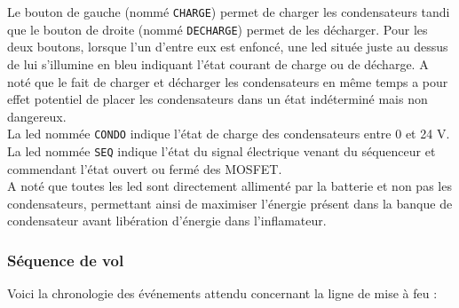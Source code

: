 \vspace{0.2cm}

Le bouton de gauche (nommé \verb|CHARGE|) permet de charger les condensateurs tandi que le bouton de droite (nommé
\verb|DECHARGE|) permet de les décharger. Pour les deux boutons, lorsque l'un d'entre eux est enfoncé, une led située juste
au dessus de lui s'illumine en bleu indiquant l'état courant de charge ou de décharge. A noté que le fait de charger et décharger
les condensateurs en même temps a pour effet potentiel de placer les condensateurs dans un état indéterminé mais non dangereux.\\

La led nommée \verb|CONDO| indique l'état de charge des condensateurs entre 0 et 24 V.\\

La led nommée \verb|SEQ| indique l'état du signal électrique venant du séquenceur et commendant l'état ouvert ou fermé des
\acrshort{MOSFET}.\\

A noté que toutes les led sont directement allimenté par la batterie et non pas les condensateurs, permettant ainsi de maximiser
l'énergie présent dans la banque de condensateur avant libération d'énergie dans l'inflamateur.

\subsubsection{Séquence de vol}

Voici la chronologie des événements attendu concernant la ligne de mise à feu :

